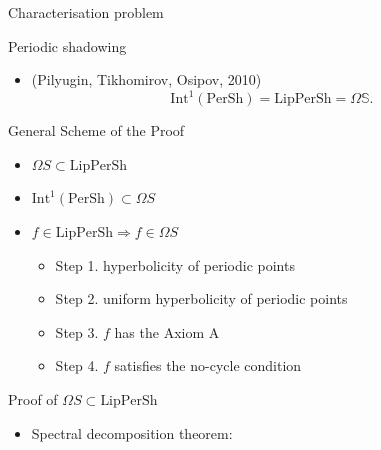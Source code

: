 \documentclass{beamer}
\begin{document}
\begin{section}{Characterisation problem}
\begin{frame}{Periodic shadowing}
\begin{itemize}
	PerSh with $\epsilon=Ld$.
	\item (Pilyugin, Tikhomirov, Osipov, 2010) $$\mbox{Int}^1(\mbox{PerSh})=\mbox{LipPerSh} = \Omega \mathbb{S}.$$
\end{itemize}	
\end{frame}
\begin{frame}{General Scheme of the Proof}
\begin{itemize}
	\item $\Omega S\subset \mbox{LipPerSh}$
	\item $\mbox{Int}^1(\mbox{PerSh})\subset\Omega S$
	\item $f\in\mbox{LipPerSh}\Rightarrow f\in\Omega S$
\begin{itemize}
	\item Step 1. hyperbolicity of periodic points
	\item Step 2. uniform hyperbolicity of periodic points
	\item Step 3. $f$ has the Axiom A
	\item Step 4. $f$ satisfies the no-cycle condition
\end{itemize}
\end{itemize}
\end{frame}
\begin{frame}{Proof of $\Omega S\subset\mbox{LipPerSh}$}
\begin{itemize}
%	
	\item Spectral decomposition theorem: 
	

\end{itemize}
\end{frame}
\end{section}
\end{document}
